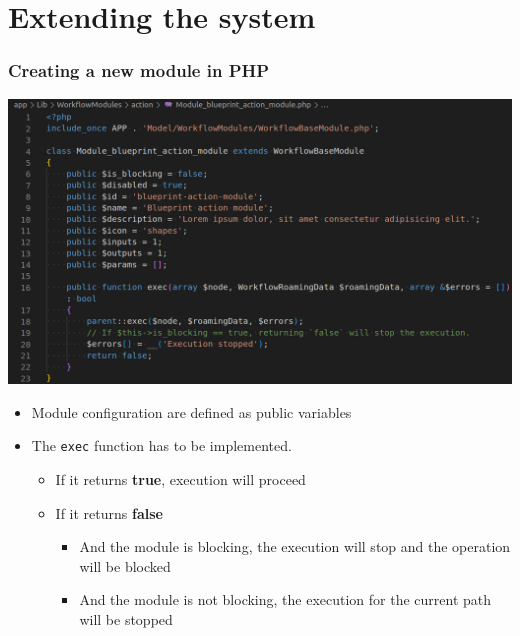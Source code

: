 \section{Extending the system}
\begin{frame}
    \frametitle{Creating a new module in PHP}
    \begin{center}
        \includegraphics[width=0.65\linewidth]{pictures/custom-1.png}
    \end{center}

    \begin{itemize}
        \item Module configuration are defined as public variables
        \item The \texttt{exec} function has to be implemented.
        \begin{itemize}
            \item If it returns \textbf{true}, execution will proceed
            \item If it returns \textbf{false}
            \begin{itemize}
                \item And the module is blocking, the execution will stop and the operation will be blocked
                \item And the module is not blocking, the execution for the current path will be stopped
            \end{itemize}
        \end{itemize}
    \end{itemize}
\end{frame}


